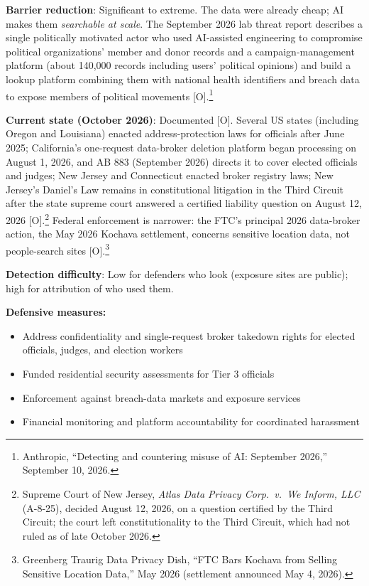 \documentclass[11pt,letterpaper]{article}
\begin{document}
\textbf{Barrier reduction}: Significant to extreme. The data were already cheap; AI makes them \textit{searchable at scale}. The September 2026 lab threat report describes a single politically motivated actor who used AI-assisted engineering to compromise political organizations' member and donor records and a campaign-management platform (about 140,000 records including users' political opinions) and build a lookup platform combining them with national health identifiers and breach data to expose members of political movements [O].\footnote{Anthropic, ``Detecting and countering misuse of AI: September 2026,'' September 10, 2026.}

\textbf{Current state (October 2026)}: Documented [O]. Several US states (including Oregon and Louisiana) enacted address-protection laws for officials after June 2025; California's one-request data-broker deletion platform began processing on August 1, 2026, and AB 883 (September 2026) directs it to cover elected officials and judges; New Jersey and Connecticut enacted broker registry laws; New Jersey's Daniel's Law remains in constitutional litigation in the Third Circuit after the state supreme court answered a certified liability question on August 12, 2026 [O].\footnote{Supreme Court of New Jersey, \textit{Atlas Data Privacy Corp.\ v.\ We Inform, LLC} (A-8-25), decided August 12, 2026, on a question certified by the Third Circuit; the court left constitutionality to the Third Circuit, which had not ruled as of late October 2026.} Federal enforcement is narrower: the FTC's principal 2026 data-broker action, the May 2026 Kochava settlement, concerns sensitive location data, not people-search sites [O].\footnote{Greenberg Traurig Data Privacy Dish, ``FTC Bars Kochava from Selling Sensitive Location Data,'' May 2026 (settlement announced May 4, 2026).}

\textbf{Detection difficulty}: Low for defenders who look (exposure sites are public); high for attribution of who used them.

\textbf{Defensive measures:}
\begin{itemize}
  \item Address confidentiality and single-request broker takedown rights for elected officials, judges, and election workers
  \item Funded residential security assessments for Tier 3 officials
  \item Enforcement against breach-data markets and exposure services
  \item Financial monitoring and platform accountability for coordinated harassment
\end{itemize}
\end{document}
